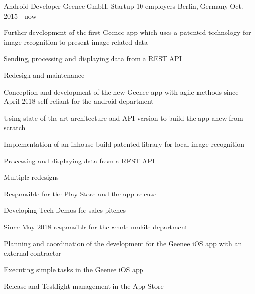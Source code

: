 

\begin{cventries}

  \cventry
    {Android Developer} %
    {Geenee GmbH, Startup 10 employees} %
    {Berlin, Germany} %
    {Oct. 2015 - now} %
    {
      \begin{cvitems} %
        \item {Further development of the first Geenee app which uses a patented technology for image recognition to present image related data}
        \begin{cvsubitems}
          \item {Sending, processing and displaying data from a REST API}
          \item {Redesign and maintenance}
        \end{cvsubitems}
        \item {Conception and development of the new Geenee app with agile methods since April 2018 self-reliant for the android department}
        \begin{cvsubitems}
          \item {Using state of the art architecture and API version to build the app anew from scratch}
          \item {Implementation of an inhouse build patented library for local image recognition}
          \item {Processing and displaying data from a REST API}
          \item {Multiple redesigns}
          \item {Responsible for the Play Store and the app release}
        \end{cvsubitems}
        \item {Developing Tech-Demos for sales pitches}
        \item {Since May 2018 responsible for the whole mobile department}
        \begin{cvsubitems}
        \item {Planning and coordination of the development for the Geenee iOS app with an external contractor}
        \item {Executing simple tasks in the Geenee iOS app}
        \item {Release and Testflight management in the App Store}
        \end{cvsubitems}
      \end{cvitems}
    }


\end{cventries}
